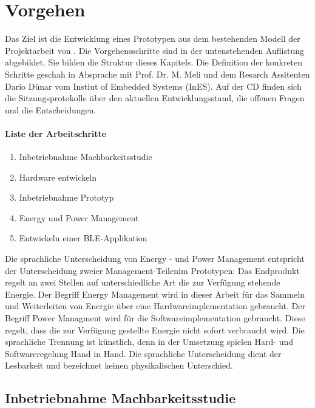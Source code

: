 \chapter{Vorgehen}
\label{ch_vorgehen} 
Das Ziel ist die Entwicklung eines Prototypen aus dem bestehenden Modell der Projektarbeit von \cite{PA_bicycle}. Die Vorgehensschritte sind in der untenstehenden Auflistung abgebildet. Sie bilden die Struktur dieses Kapitels. Die Definition der konkreten Schritte geschah in Absprache mit Prof. Dr. M. Meli und dem Resarch Assitenten Dario Dünar vom Instiut of Embedded Systems (InES). Auf der CD finden sich die Sitzungsprotokolle über den aktuellen Entwicklungsstand, die offenen Fragen und die Entscheidungen.

\subsubsection*{Liste der Arbeitschritte}
\label{liste} 

\begin{enumerate}
  \item Inbetriebnahme Machbarkeitsstudie  
  \item Hardware entwickeln  
  \item Inbetriebnahme Prototyp      
  \item  Energy und Power Management
  \item Entwickeln einer BLE-Applikation       
 \end{enumerate}  

Die sprachliche Unterscheidung von Energy - und Power Management entspricht der Unterscheidung zweier \glqq Management-Teilen\grqq im Prototypen: Das Endprodukt regelt an zwei Stellen auf unterschiedliche Art die zur Verfügung stehende Energie. Der Begriff Energy Management wird in dieser Arbeit für das Sammeln und Weiterleiten von Energie über eine Hardwareimplementation gebraucht. Der Begriff Power Managment wird für die Softwareimplementation gebraucht. Diese regelt, dass die zur Verfügung gestellte Energie nicht sofort verbraucht wird. Die sprachliche Trennung ist künstlich, denn in der Umsetzung spielen Hard- und Softwareregelung Hand in Hand. Die sprachliche Unterscheidung dient der Lesbarkeit und bezeichnet keinen physikalischen Unterschied.
 
 
  
 
\section{Inbetriebnahme Machbarkeitsstudie}\label{v_inbetriebnahme} 

